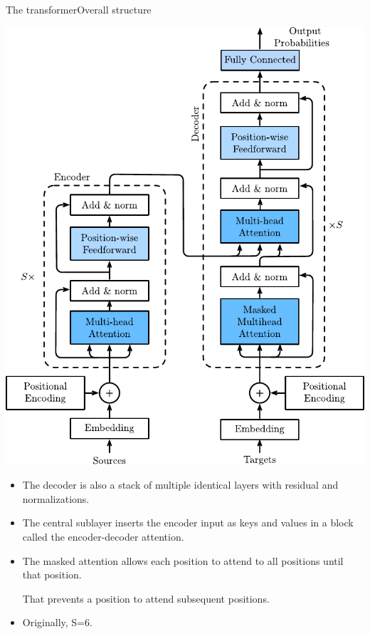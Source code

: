 \documentclass{beamer}
\begin{document}
\begin{frame}{The transformer}{Overall structure}
\vspace{-0.8cm}
\begin{multicols}{2}
\includegraphics[scale=0.49]{Module 6 (Attention-based networks)/pics/transformer.pdf}
\columnbreak    
\begin{itemize}
    \item   The decoder is also a stack of multiple identical layers with residual and normalizations.
    \item The central sublayer inserts the encoder input as keys and values in a block called the encoder-decoder attention.
    \item The masked attention allows each position to attend to all positions until that position. 

    That prevents a position to attend subsequent positions.

    \item Originally, S=6.
\end{itemize}

\end{multicols}
\end{frame}
\end{document}

